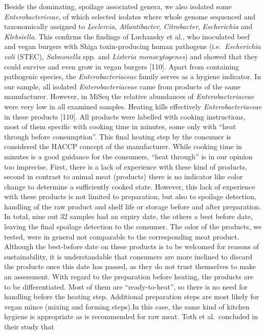 \documentclass[preprint,3p,
a4paper]{elsarticle} %
\begin{document}
Beside the dominating, spoilage associated genera, we also isolated some
\emph{Enterobactericeae}, of which selected isolates where whole genome
sequenced and taxonomically assigned to \emph{Leclercia},
\emph{Atlantibacter}, \emph{Citrobacter}, \emph{Escherichia} and
\emph{Klebsiella}. This confirms the findings of Luchansky et al., who
inoculated beef and vegan burgers with Shiga toxin-producing human
pathogens (i.e.~\emph{Escherichia coli} (STEC), \emph{Salmonella} spp.
and \emph{Listeria monocytogenes}) and showed that they could survive
and even grow in vegan burgers {[}110{]}. Apart from containing
pathogenic species, the \emph{Enterobacteriaceae} family serves as a
hygiene indicator. In our sample, all isolated \emph{Enterobacteriaceae}
came from products of the same manufacturer. However, in MiSeq the
relative abundances of \emph{Enterobacteriaceae} were very low in all
examined samples. Heating kills effectively \emph{Enterobacteriaceae} in
these products {[}110{]}. All products were labelled with cooking
instructions, most of them specific with cooking time in minutes, some
only with ``heat through before consumption''. This final heating step
by the consumer is considered the HACCP concept of the manufacturer.
While cooking time in minutes is a good guidance for the consumers,
``heat through'' is in our opinion too imprecise. First, there is a lack
of experience with these kind of products, second in contrast to animal
meat (products) there is no indicator like color change to determine a
sufficiently cooked state. However, this lack of experience with these
products is not limited to preparation, but also to spoilage detection,
handling of the raw product and shelf life or storage before and after
preparation. In total, nine out 32 samples had an expiry date, the
others a best before date, leaving the final spoilage detection to the
consumer. The odor of the products, we tested, were in general not
comparable to the corresponding meat product. Although the best-before
date on these products is to be welcomed for reasons of sustainability,
it is understandable that consumers are more inclined to discard the
products once this date has passed, as they do not trust themselves to
make an assessment. With regard to the preparation before heating, the
products are to be differentiated. Most of them are ``ready-to-heat'',
so there is no need for handling before the heating step. Additional
preparation steps are most likely for vegan mince (mixing and forming
steps).In this case, the same kind of kitchen hygiene is appropriate as
is recommended for raw meat. Toth et al.~concluded in their study that
\end{document}
